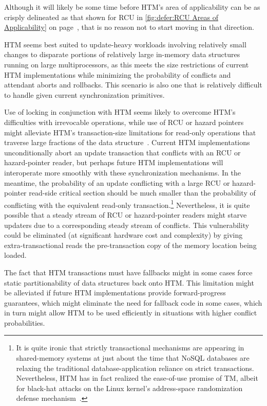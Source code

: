 Although it will likely be some time before HTM's area of applicability
can be as crisply delineated as that shown for RCU in
\cref{fig:defer:RCU Areas of Applicability} on
page~\pageref{fig:defer:RCU Areas of Applicability}, that is no reason not to
start moving in that direction.

HTM seems best suited to update-heavy workloads involving relatively
small changes to disparate portions of relatively large in-memory
data structures running on large multiprocessors,
as this meets the size restrictions of current HTM implementations while
minimizing the probability of conflicts and attendant aborts and
rollbacks.
This scenario is also one that is relatively difficult to handle given
current synchronization primitives.

Use of locking in conjunction with HTM seems likely to overcome HTM's
difficulties with irrevocable operations, while use of RCU or
hazard pointers might alleviate HTM's transaction-size limitations
for read-only operations that traverse large fractions of the data
structure~\cite{SeongJaePark2020HTMRCUlock}.
Current HTM implementations unconditionally abort an update transaction
that conflicts with an RCU or hazard-pointer reader, but perhaps future
HTM implementations will interoperate more smoothly with these
synchronization mechanisms.
In the meantime, the probability of an update conflicting with a
large RCU or hazard-pointer read-side critical section should be
much smaller than the probability of conflicting with the equivalent
read-only transaction.\footnote{
	It is quite ironic that strictly transactional mechanisms are
	appearing in shared-memory systems at just about the time
	that NoSQL databases are relaxing the traditional
	database-application reliance on strict transactions.
	Nevertheless, HTM has in fact realized the ease-of-use promise
	of TM, albeit for black-hat attacks on the Linux kernel's
	address-space randomization defense
	mechanism~\cite{YeongjinJang2016TSXbreakKASLR,Jang:2016:BKA:2976749.2978321}.}
Nevertheless, it is quite possible that a steady stream of RCU or
hazard-pointer readers might starve updaters due to a corresponding
steady stream of conflicts.
This vulnerability could be eliminated (at significant
hardware cost and complexity) by giving extra-transactional
reads the pre-transaction copy of the memory location being loaded.

The fact that HTM transactions must have fallbacks might in some cases
force static partitionability of data structures back onto HTM.
This limitation might be alleviated if future HTM implementations
provide forward-progress guarantees, which might eliminate the need
for fallback code in some cases, which in turn might allow HTM to
be used efficiently in situations with higher conflict probabilities.

